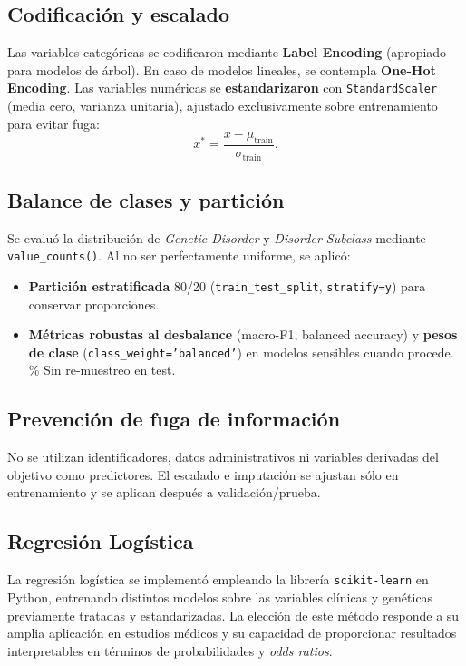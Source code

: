 \documentclass[11pt,a4paper,spanish]{book}
\numberwithin{equation}{chapter}
\numberwithin{figure}{chapter}
\begin{document}
\subsection*{Codificación y escalado}
Las variables categóricas se codificaron mediante \textbf{Label Encoding} (apropiado para modelos de árbol). En caso de modelos lineales, se contempla \textbf{One-Hot Encoding}.  
Las variables numéricas se \textbf{estandarizaron} con \texttt{StandardScaler} (media cero, varianza unitaria), ajustado exclusivamente sobre entrenamiento para evitar fuga:
\[
x^{*}=\frac{x-\mu_{\text{train}}}{\sigma_{\text{train}}}.
\]

\subsection*{Balance de clases y partición}
Se evaluó la distribución de \textit{Genetic Disorder} y \textit{Disorder Subclass} mediante \texttt{value\_counts()}. Al no ser perfectamente uniforme, se aplicó:
\begin{itemize}
    \item \textbf{Partición estratificada} 80/20 (\texttt{train\_test\_split}, \texttt{stratify=y}) para conservar proporciones.
    \item \textbf{Métricas robustas al desbalance} (macro-F1, balanced accuracy) y \textbf{pesos de clase} (\texttt{class\_weight='balanced'}) en modelos sensibles cuando procede. \% Sin re-muestreo en test.
\end{itemize}

\subsection*{Prevención de fuga de información}
No se utilizan identificadores, datos administrativos ni variables derivadas del objetivo como predictores. El escalado e imputación se ajustan sólo en entrenamiento y se aplican después a validación/prueba.
\subsection{Regresión Logística}

La regresión logística se implementó empleando la librería \texttt{scikit-learn} en Python, 
entrenando distintos modelos sobre las variables clínicas y genéticas previamente tratadas 
y estandarizadas. La elección de este método responde a su amplia aplicación en estudios 
médicos y su capacidad de proporcionar resultados interpretables en términos de 
probabilidades y \textit{odds ratios}.
\end{document}

